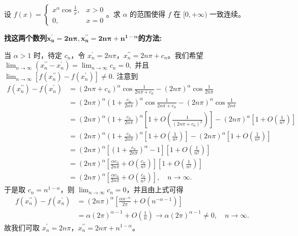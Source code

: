 \documentclass[../../main.tex]{subfiles}%
\begin{document}
\begin{example}
设 \( f(x) = \begin{cases} 
x^\alpha \cos \frac{1}{x}, & x > 0 \\ 
0, & x = 0 
\end{cases} \)。求 \(\alpha\) 的范围使得 \(f\) 在 \([0, +\infty)\) 一致连续。
\end{example}
\begin{note}
\hypertarget{找两个数列的方式123}{\textbf{找这两个数列$\boldsymbol{x}_{\boldsymbol{n}}^{\prime}=\mathbf{2}\boldsymbol{n\pi },\boldsymbol{x}_{\boldsymbol{n}}^{\prime\prime}=\mathbf{2}\boldsymbol{n\pi }+\boldsymbol{n}^{\mathbf{1}-\boldsymbol{\alpha }}$的方法:}}
当 $\alpha > 1$ 时，待定 $c_n$，令 $x_{n}^{\prime} = 2n\pi$，$x_{n}^{\prime\prime} = 2n\pi + c_n$。我们希望
\(
\lim_{n \rightarrow \infty} \left( x_{n}^{\prime\prime} - x_{n}^{\prime} \right) = \lim_{n \rightarrow \infty} c_n = 0,
\)
并且
\(
\lim_{n \rightarrow \infty} \left[ f\left( x_{n}^{\prime\prime} \right) - f\left( x_{n}^{\prime} \right) \right] \ne 0.
\)
注意到
\begin{align*}
f\left( x_{n}^{\prime\prime} \right) - f\left( x_{n}^{\prime} \right) &= \left( 2n\pi + c_n \right)^{\alpha} \cos \frac{1}{2n\pi + c_n} - \left( 2n\pi \right)^{\alpha} \cos \frac{1}{2n\pi} \\
&= \left( 2n\pi \right)^{\alpha} \left( 1 + \frac{c_n}{2n\pi} \right)^{\alpha} \cos \frac{1}{2n\pi + c_n} - \left( 2n\pi \right)^{\alpha} \cos \frac{1}{2n\pi} \\
&= \left( 2n\pi \right)^{\alpha} \left( 1 + \frac{c_n}{2n\pi} \right)^{\alpha} \left[ 1 + O\left( \frac{1}{\left( 2n\pi + c_n \right)^2} \right) \right] - \left( 2n\pi \right)^{\alpha} \left[ 1 + O\left( \frac{1}{n^2} \right) \right] \\
&= \left( 2n\pi \right)^{\alpha} \left( 1 + \frac{c_n}{2n\pi} \right)^{\alpha} \left[ 1 + O\left( \frac{1}{n^2} \right) \right] - \left( 2n\pi \right)^{\alpha} \left[ 1 + O\left( \frac{1}{n^2} \right) \right] \\
&= \left( 2n\pi \right)^{\alpha} \left[ \left( 1 + \frac{c_n}{2n\pi} \right)^{\alpha} - 1 \right] \left[ 1 + O\left( \frac{1}{n^2} \right) \right] \\
&= \left( 2n\pi \right)^{\alpha} \left[ \frac{\alpha c_n}{2n\pi} + O\left( \frac{c_n}{n^2} \right) \right] \left[ 1 + O\left( \frac{1}{n^2} \right) \right] \\
&= \left( 2n\pi \right)^{\alpha} \left[ \frac{\alpha c_n}{2n\pi} + O\left( \frac{c_n}{n^2} \right) \right], \quad n \rightarrow \infty.
\end{align*}
于是取 $c_n = n^{1 - \alpha}$，则 $\lim_{n \rightarrow \infty} c_n = 0$，并且由上式可得
\begin{align*}
f\left( x_{n}^{\prime\prime} \right) - f\left( x_{n}^{\prime} \right) &= \left( 2n\pi \right)^{\alpha} \left[ \frac{\alpha n^{-\alpha}}{2\pi} + O\left( n^{-\alpha - 1} \right) \right] \\
&= \alpha \left( 2\pi \right)^{\alpha - 1} + O\left( \frac{1}{n} \right) \rightarrow \alpha \left( 2\pi \right)^{\alpha - 1} \ne 0, \quad n \rightarrow \infty.
\end{align*}
故我们可取 $x_{n}^{\prime} = 2n\pi$，$x_{n}^{\prime\prime} = 2n\pi + n^{1 - \alpha}$。
\end{note}
\end{document}
